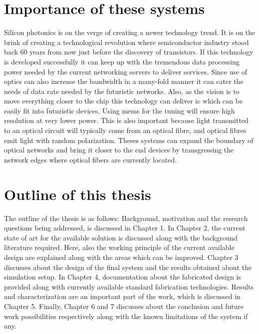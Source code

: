 \documentclass[../report.tex]{subfiles}
\begin{document}
	\section{Importance of these systems}
Silicon photonics is on the verge of creating a newer technology trend. It is on the brink of creating a technological revolution where semiconductor industry stood back 60 years from now just before the discovery of transistors. If this technology is developed successfully it can keep up with the tremendous data processing power needed by the current networking servers to deliver services. Since use of optics can also increase the bandwidth in a many-fold manner it can cater the needs of data rate needed by the futuristic networks. Also, as the vision is to move everything closer to the chip this technology can deliver \gls{ic} which can be easily fit into futuristic devices. Using \gls{mems} for the tuning will ensure high resolution at very lower power. This is also important because light transmitted to an optical circuit will typically come from an optical fibre, and optical fibres emit light with random polarization. Theses systems can expand the boundary of optical networks and bring it closer to the end devices by transgressing the network edges where optical fibers are currently located.
	
	\section{Outline of this thesis}
The outline of the thesis is as follows: Background, motivation and the research
questions being addressed, is discussed in Chapter 1. In Chapter 2, the current state of art for the available solution is discussed along with the background literature required. Here, also the working principle of the current available design are explained along with the areas which can be improved. Chapter 3 discusses about the design of the final system and the results obtained about the simulation setup. In Chapter 4, documentation about the fabricated design is provided along with currently available standard fabrication technologies. Results and characterization are an important part of the work, which is discussed in Chapter 5. Finally, Chapter 6 and 7 discusses about the conclusion and future work possibilities respectively along with the known limitations of the system if any.  
	
\end{document}
